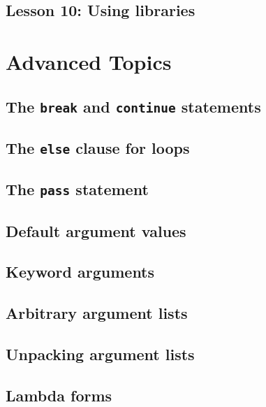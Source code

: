 \documentclass[article,A4,12pt]{llncs}
\begin{document}
\subsection{Lesson 10: Using libraries}



\section{Advanced Topics} \label{sec:adv}


\subsection{The {\tt break} and {\tt continue} statements}



\subsection{The {\tt else} clause for loops}



\subsection{The {\tt pass} statement}






\subsection{Default argument values}


\subsection{Keyword arguments}


\subsection{Arbitrary argument lists}


\subsection{Unpacking argument lists}


\subsection{Lambda forms}
\end{document}
